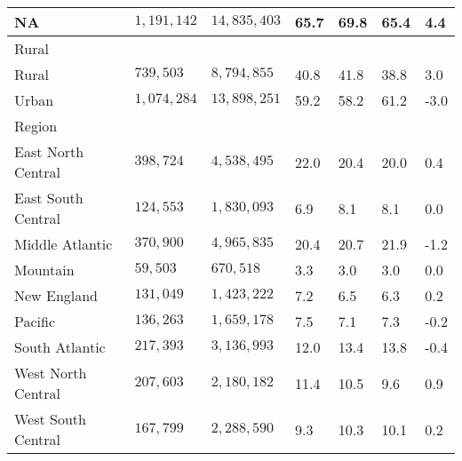 \begin{longtable}{lllllll}
NA & $1,191,142$ & $14,835,403$ & 65.7 & 69.8 & 65.4 & 4.4 \\ 
\midrule
\multicolumn{1}{l}{Rural} \\ 
\midrule
Rural & $739,503$ & $8,794,855$ & 40.8 & 41.8 & 38.8 & 3.0 \\ 
Urban & $1,074,284$ & $13,898,251$ & 59.2 & 58.2 & 61.2 & -3.0 \\ 
\midrule
\multicolumn{1}{l}{Region} \\ 
\midrule
East North Central  & $398,724$ & $4,538,495$ & 22.0 & 20.4 & 20.0 & 0.4 \\ 
East South Central  & $124,553$ & $1,830,093$ & 6.9 & 8.1 & 8.1 & 0.0 \\ 
Middle Atlantic  & $370,900$ & $4,965,835$ & 20.4 & 20.7 & 21.9 & -1.2 \\ 
Mountain  & $59,503$ & $670,518$ & 3.3 & 3.0 & 3.0 & 0.0 \\ 
New England  & $131,049$ & $1,423,222$ & 7.2 & 6.5 & 6.3 & 0.2 \\ 
Pacific  & $136,263$ & $1,659,178$ & 7.5 & 7.1 & 7.3 & -0.2 \\ 
South Atlantic  & $217,393$ & $3,136,993$ & 12.0 & 13.4 & 13.8 & -0.4 \\ 
West North Central  & $207,603$ & $2,180,182$ & 11.4 & 10.5 & 9.6 & 0.9 \\ 
West South Central  & $167,799$ & $2,288,590$ & 9.3 & 10.3 & 10.1 & 0.2 \\ 
 \bottomrule
\end{longtable}

